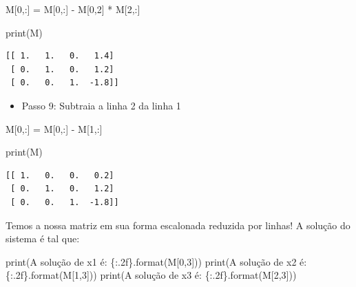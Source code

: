 \documentclass[
  brazilian,
  letterpaper,
  DIV=11,
  numbers=noendperiod]{scrreprt}
\newenvironment{Shaded}{\begin{snugshade}}{\end{snugshade}}
\newcommand{\BuiltInTok}[1]{\textcolor[rgb]{0.00,0.23,0.31}{#1}}
\newcommand{\DecValTok}[1]{\textcolor[rgb]{0.68,0.00,0.00}{#1}}
\newcommand{\NormalTok}[1]{\textcolor[rgb]{0.00,0.23,0.31}{#1}}
\newcommand{\OperatorTok}[1]{\textcolor[rgb]{0.37,0.37,0.37}{#1}}
\newcommand{\SpecialCharTok}[1]{\textcolor[rgb]{0.37,0.37,0.37}{#1}}
\newcommand{\StringTok}[1]{\textcolor[rgb]{0.13,0.47,0.30}{#1}}
\providecommand{\tightlist}{%
  \setlength{\itemsep}{0pt}\setlength{\parskip}{0pt}}
\begin{document}
\begin{Shaded}
\begin{Highlighting}[]
\NormalTok{M[}\DecValTok{0}\NormalTok{,:] }\OperatorTok{=}\NormalTok{ M[}\DecValTok{0}\NormalTok{,:] }\OperatorTok{{-}}\NormalTok{ M[}\DecValTok{0}\NormalTok{,}\DecValTok{2}\NormalTok{] }\OperatorTok{*}\NormalTok{ M[}\DecValTok{2}\NormalTok{,:]}

\BuiltInTok{print}\NormalTok{(M)}
\end{Highlighting}
\end{Shaded}

\begin{verbatim}
[[ 1.   1.   0.   1.4]
 [ 0.   1.   0.   1.2]
 [ 0.   0.   1.  -1.8]]
\end{verbatim}

\begin{itemize}
\tightlist
\item
  Passo 9: Subtraia a linha 2 da linha 1
\end{itemize}

\begin{Shaded}
\begin{Highlighting}[]
\NormalTok{M[}\DecValTok{0}\NormalTok{,:] }\OperatorTok{=}\NormalTok{ M[}\DecValTok{0}\NormalTok{,:] }\OperatorTok{{-}}\NormalTok{ M[}\DecValTok{1}\NormalTok{,:]}

\BuiltInTok{print}\NormalTok{(M)}
\end{Highlighting}
\end{Shaded}

\begin{verbatim}
[[ 1.   0.   0.   0.2]
 [ 0.   1.   0.   1.2]
 [ 0.   0.   1.  -1.8]]
\end{verbatim}

Temos a nossa matriz em sua forma escalonada reduzida por linhas! A
solução do sistema é tal que:

\begin{Shaded}
\begin{Highlighting}[]
\BuiltInTok{print}\NormalTok{(}\StringTok{\textquotesingle{}A solução de x1 é: }\SpecialCharTok{\{:.2f\}}\StringTok{\textquotesingle{}}\NormalTok{.}\BuiltInTok{format}\NormalTok{(M[}\DecValTok{0}\NormalTok{,}\DecValTok{3}\NormalTok{]))}
\BuiltInTok{print}\NormalTok{(}\StringTok{\textquotesingle{}A solução de x2 é: }\SpecialCharTok{\{:.2f\}}\StringTok{\textquotesingle{}}\NormalTok{.}\BuiltInTok{format}\NormalTok{(M[}\DecValTok{1}\NormalTok{,}\DecValTok{3}\NormalTok{]))}
\BuiltInTok{print}\NormalTok{(}\StringTok{\textquotesingle{}A solução de x3 é: }\SpecialCharTok{\{:.2f\}}\StringTok{\textquotesingle{}}\NormalTok{.}\BuiltInTok{format}\NormalTok{(M[}\DecValTok{2}\NormalTok{,}\DecValTok{3}\NormalTok{]))}
\end{Highlighting}
\end{Shaded}
\end{document}
